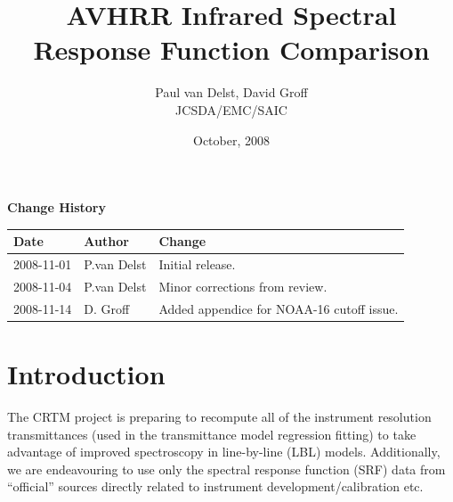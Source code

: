 



\title{AVHRR Infrared Spectral Response Function Comparison}
\author{Paul van Delst, David Groff\\JCSDA/EMC/SAIC}
\date{October, 2008}



\maketitle


\thispagestyle{empty}
\vspace*{10cm}
\begin{center}
  {\sffamily\Large\bfseries Change History}
  \begin{table}[htp]
    \centering
    \begin{tabular}{|p{2cm}|p{3cm}|p{8cm}|}
      \hline
      \sffamily\textbf{Date} & \sffamily\textbf{Author} & \sffamily\textbf{Change}\\
      \hline\hline
      2008-11-01 & P.van Delst & Initial release.\\
      \hline
      2008-11-04 & P.van Delst & Minor corrections from review.\\
      \hline
      2008-11-14 & D. Groff & Added appendice for NOAA-16 cutoff issue.\\
      \hline
    \end{tabular}
  \end{table}
\end{center}
\clearpage
{}
\setcounter{page}{1}



\section{Introduction}
The CRTM project is preparing to recompute all of the instrument resolution transmittances (used in the transmittance model regression fitting) to take advantage of improved spectroscopy in line-by-line (LBL) models. Additionally, we are endeavouring to use only the spectral response function (SRF) data from ``official'' sources directly related to instrument development/calibration etc.


